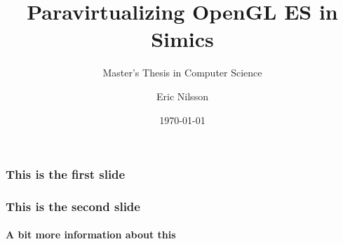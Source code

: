 \documentclass{beamer}
\title{Paravirtualizing OpenGL ES in Simics}
\subtitle{Master's Thesis in Computer Science}
\author{Eric Nilsson}
\institute{Blekinge Institute of Technology}
\date{\today} %
\begin{document}
	
	
	\begin{frame}
	\frametitle{This is the first slide}
	\end{frame}

	\begin{frame}

	\frametitle{This is the second slide}
	\framesubtitle{A bit more information about this}
	\end{frame}

	
\end{document}
